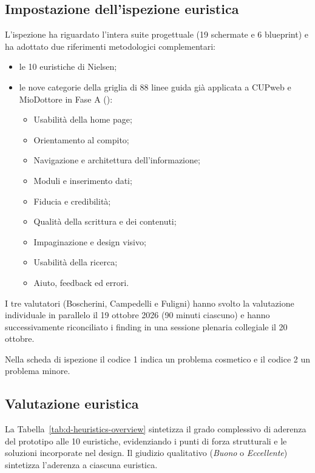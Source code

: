 \subsection{Impostazione dell'ispezione euristica}


L'ispezione ha riguardato l'intera suite progettuale (19 schermate e 6 blueprint) e ha adottato due riferimenti metodologici complementari:
\begin{itemize}
\item le 10 euristiche di Nielsen;
\item le nove categorie della griglia di 88 linee guida già applicata a CUPweb e MioDottore in Fase A ():
  \begin{itemize}
  \item Usabilità della home page;
  \item Orientamento al compito;
  \item Navigazione e architettura dell'informazione;
  \item Moduli e inserimento dati;
  \item Fiducia e credibilità;
  \item Qualità della scrittura e dei contenuti;
  \item Impaginazione e design visivo;
  \item Usabilità della ricerca;
  \item Aiuto, feedback ed errori.
  \end{itemize}
\end{itemize}

I tre valutatori (Boscherini, Campedelli e Fuligni) hanno svolto la valutazione individuale in parallelo il 19 ottobre 2026 (90 minuti ciascuno) e hanno successivamente riconciliato i finding in una sessione plenaria collegiale il 20 ottobre.

Nella scheda di ispezione il codice 1 indica un problema cosmetico e il codice 2 un problema minore.

\subsection{Valutazione euristica}

La Tabella~\ref{tab:d-heuristics-overview} sintetizza il grado complessivo di aderenza del prototipo alle 10 euristiche, evidenziando i punti di forza strutturali e le soluzioni incorporate nel design. Il giudizio qualitativo (\emph{Buono} o \emph{Eccellente}) sintetizza l'aderenza a ciascuna euristica.

